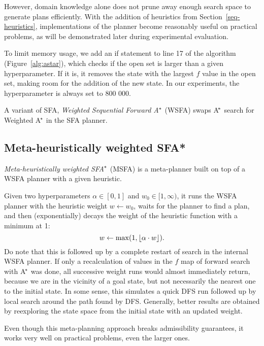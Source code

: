 However, domain knowledge alone does not
prune away enough search space to
generate plans efficiently.
With the addition of
heuristics
from Section~\ref{seq-heuristics},
implementations of the planner become reasonably useful
on practical problems, as will be demonstrated
later during experimental evaluation.

To limit memory usage, we add an if statement to line 17 of the algorithm
(Figure~\ref{alg:astar}),
which checks if the open set is larger than a given hyperparameter.
If it is, it removes the state with the largest $f$ value in the open set,
making room for the addition of the new state. In our experiments,
the hyperparameter is always set to 800 000.

A variant of SFA,
\textit{Weighted Sequential Forward A$^{\kern-.05em*}$} (WSFA)
swaps A$^{\kern-.15em*}$ search for Weighted A$^{\kern-.15em*}$ in the SFA planner.

\subsection{Meta-heuristically weighted SFA*}\label{msfa}

\textit{Meta-heuristically weighted SFA$^{\kern-.05em*}$} (MSFA) is
a meta-planner built on top of a WSFA planner with
a given heuristic.

Given two hyperparameters $\alpha \in [0, 1]$ and $w_0 \in [1, \infty)$,
it runs the WSFA planner with the heuristic weight $w \gets w_0$,
waits for the planner to find a plan,
and then (exponentially) decays the
weight of the heuristic function
with a minimum at 1:
$$w \gets \max(1, \floor*{\alpha \cdot w}).$$
Do note that this is followed up by a complete restart of search in the internal WSFA planner.
If only a recalculation of values in the $f$ map
of forward search with A$^{\kern-.15em*}$ was done, all successive
weight runs would almost immediately return, because we are in the vicinity of a goal state,
but not necessarily the nearest one to the initial state.
In some sense, this simulates a quick DFS run followed up
by local search around the path found by DFS.
Generally, better results are obtained by reexploring the
state space from the initial state with an updated weight.

Even though this meta-planning approach breaks
admissibility guarantees, it works very well on
practical problems, even the larger ones.




















